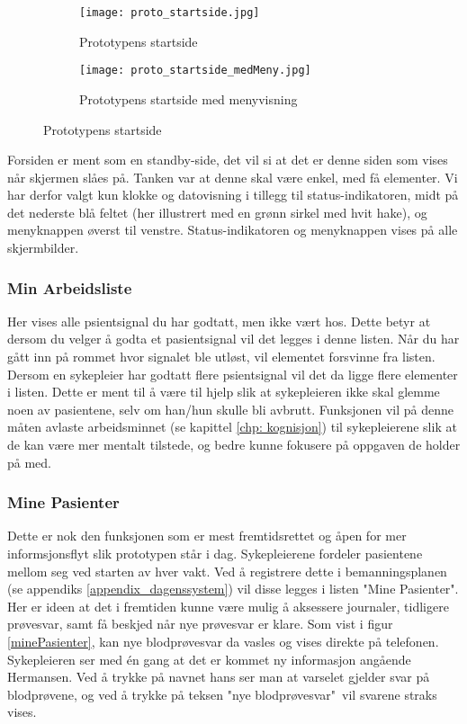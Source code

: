 \begin{figure}[H]
	\centering
	\begin{subfigure}[b]{0.48\textwidth}
		\texttt{[image: proto\_startside.jpg]}
		\caption{Prototypens startside}
		\label{proto_startside}
	\end{subfigure}
	\begin{subfigure}[b]{0.48\textwidth}
		\texttt{[image: proto\_startside\_medMeny.jpg]}
		\caption{Prototypens startside med menyvisning}
		\label{proto_startside_medMeny}
	\end{subfigure}
	\caption{Prototypens startside}
\end{figure}

\noindent
Forsiden er ment som en standby-side, det vil si at det er denne siden som vises når skjermen slåes på. Tanken var at denne skal være enkel, med få elementer. Vi har derfor valgt kun klokke og datovisning i tillegg til status-indikatoren, midt på det nederste blå feltet (her illustrert med en grønn sirkel med hvit hake), og menyknappen øverst til venstre. Status-indikatoren og menyknappen vises på alle skjermbilder. 

\subsubsection{Min Arbeidsliste}
Her vises alle psientsignal du har godtatt, men ikke vært hos. Dette betyr at dersom du velger å godta et pasientsignal vil det legges i denne listen. Når du har gått inn på rommet hvor signalet ble utløst, vil elementet forsvinne fra listen. Dersom en sykepleier har godtatt flere psientsignal vil det da ligge flere elementer i listen. Dette er ment til å være til hjelp slik at sykepleieren ikke skal glemme noen av pasientene, selv om han/hun skulle bli avbrutt. Funksjonen vil på denne måten avlaste arbeidsminnet (se kapittel \ref{chp: kognisjon}) til sykepleierene slik at de kan være mer mentalt tilstede, og bedre kunne fokusere på oppgaven de holder på med.

\subsubsection{Mine Pasienter}
Dette er nok den funksjonen som er mest fremtidsrettet og åpen for mer informsjonsflyt slik prototypen står i dag. Sykepleierene fordeler pasientene mellom seg ved starten av hver vakt. Ved å registrere dette i bemanningsplanen (se appendiks \ref{appendix_dagenssystem}) vil disse legges i listen "Mine Pasienter". Her er ideen at det i fremtiden kunne være mulig å aksessere journaler, tidligere prøvesvar, samt få beskjed når nye prøvesvar er klare. Som vist i figur \ref{minePasienter}, kan nye blodprøvesvar da vasles og vises direkte på telefonen. Sykepleieren ser med én gang at det er kommet ny informasjon angående Hermansen. Ved å trykke på navnet hans ser man at varselet gjelder svar på blodprøvene, og ved å trykke på teksen "nye blodprøvesvar"\ vil svarene straks vises.

